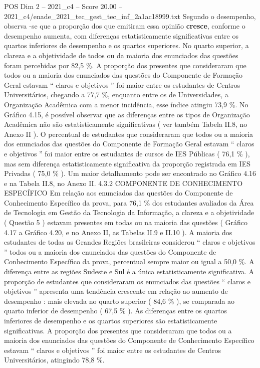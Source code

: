 \begin{textsample}{POS Dim 2 – 2021\_c4 – Score 20.00 – 2021\_c4/enade\_2021\_tec\_gest\_tec\_inf\_2a1ac18999.txt}
Segundo o desempenho, observa -se que a proporção dos que emitiram essa opinião \textbf{cresce}, conforme o desempenho aumenta, com diferenças estatisticamente significativas entre os quartos inferiores de desempenho e os quartos superiores.
No quarto superior, a clareza e a objetividade de todos ou da maioria dos enunciados das questões foram percebidas por 82,5 \%.
A proporção dos presentes que consideraram que todos ou a maioria dos enunciados das questões do Componente de Formação Geral estavam “ claros e objetivos ” foi maior entre os estudantes de Centros Universitários, chegando a 77,7 \%, enquanto entre os de Universidades, a Organização Acadêmica com a menor incidência, esse índice atingiu 73,9 \%.
No Gráfico 4.15, é possível observar que as diferenças entre os tipos de Organização Acadêmica não são estatisticamente significativas ( ver também Tabela II.8, no Anexo II ).
O percentual de estudantes que consideraram que todos ou a maioria dos enunciados das questões do Componente de Formação Geral estavam “ claros e objetivos ” foi maior entre os estudantes de cursos de IES Públicas ( 76,1 \% ), mas sem diferença estatisticamente significativa da proporção registrada em IES Privadas ( 75,0 \% ).
Um maior detalhamento pode ser encontrado no Gráfico 4.16 e na Tabela II.8, no Anexo II. 4.3.2 COMPONENTE DE CONHECIMENTO ESPECÍFICO Em relação aos enunciados das questões do Componente de Conhecimento Específico da prova, para 76,1 \% dos estudantes avaliados da Área de Tecnologia em Gestão da Tecnologia da Informação, a clareza e a objetividade ( Questão 5 ) estavam presentes em todas ou na maioria das questões ( Gráfico 4.17 a Gráfico 4.20, e no Anexo II, as Tabelas II.9 e II.10 ).
A maioria dos estudantes de todas as Grandes Regiões brasileiras considerou “ claros e objetivos ” todos ou a maioria dos enunciados das questões do Componente de Conhecimento Específico da prova, percentual sempre maior ou igual a 50,0 \%.
A diferença entre as regiões Sudeste e Sul é a única estatisticamente significativa.
A proporção de estudantes que consideraram os enunciados das questões “ claros e objetivos ” apresenta uma tendência crescente em relação ao aumento de desempenho : mais elevada no quarto superior ( 84,6 \% ), se comparada ao quarto inferior de desempenho ( 67,5 \% ).
As diferenças entre os quartos inferiores de desempenho e os quartos superiores são estatisticamente significativas.
A proporção dos presentes que consideraram que todos ou a maioria dos enunciados das questões do Componente de Conhecimento Específico estavam “ claros e objetivos ” foi maior entre os estudantes de Centros Universitários, atingindo 78,8 \%.

\end{textsample}
